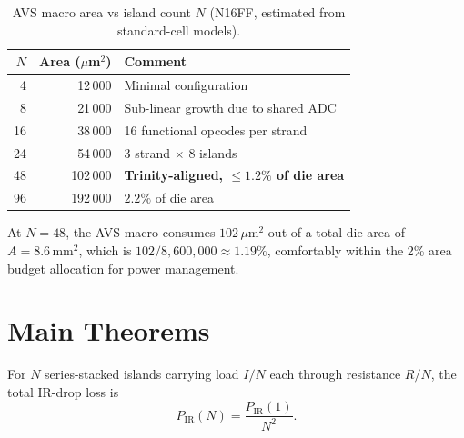 \begin{table}[ht]
\centering
\caption{AVS macro area vs island count $N$ (N16FF, estimated from
standard-cell models).}
\label{tab:area_vs_n}
\begin{tabular}{rrl}
\hline
$N$ & Area ($\mu$m$^2$) & Comment \\
\hline
  4 &  12\,000 & Minimal configuration \\
  8 &  21\,000 & Sub-linear growth due to shared ADC \\
 16 &  38\,000 & 16 functional opcodes per strand \\
 24 &  54\,000 & 3 strand $\times$ 8 islands \\
 48 & 102\,000 & \textbf{Trinity-aligned, $\leq 1.2\%$ of die area} \\
 96 & 192\,000 & $2.2\%$ of die area \\
\hline
\end{tabular}
\end{table}

At $N = 48$, the AVS macro consumes $102\,\mu\mathrm{m}^2$ out of a total die
area of $A = 8.6\,\mathrm{mm}^2$, which is $102/8{,}600{,}000 \approx 1.19\%$,
comfortably within the 2\% area budget allocation for power management.

\section{Main Theorems}
\label{sec:theorems}

\begin{theorem}
\label{thm:ir_drop_quadratic}
For $N$ series-stacked islands carrying load $I/N$ each through
resistance $R/N$, the total IR-drop loss is
\[
  P_{\mathrm{IR}}(N) = \frac{P_{\mathrm{IR}}(1)}{N^2}.
\]
\end{theorem}

